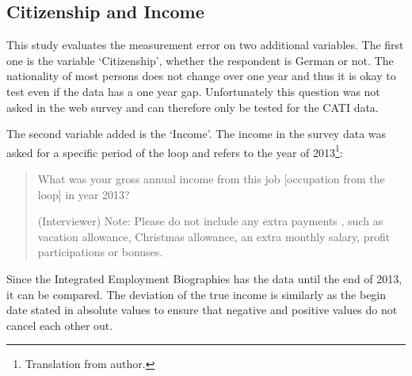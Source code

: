 
\subsection{Citizenship and Income}

This study evaluates the measurement error on two additional variables. The first one is the variable `Citizenship', whether the respondent is German or not. The nationality of most persons does not change over one year and thus it is okay to test even if the data has a one year gap. Unfortunately this question was not asked in the web survey and can therefore only be tested for the CATI data.

The second variable added is the `Income'. The income in the survey data was asked for a specific period of the loop and refers to the year of 2013\footnote{Translation from author.}:


\begin{quote}
\begin {small}

What was your gross annual income from this job [occupation from the loop] in year 2013?

(Interviewer) Note: Please do not include any extra payments , such as vacation allowance, Christmas allowance, an extra monthly salary, profit participations or bonuses.

\end{small}
\end{quote}


Since the Integrated Employment Biographies has the data until the end of 2013, it can be compared. The deviation of the true income is similarly as the begin date stated in absolute values to ensure that negative and positive values do not cancel each other out.

